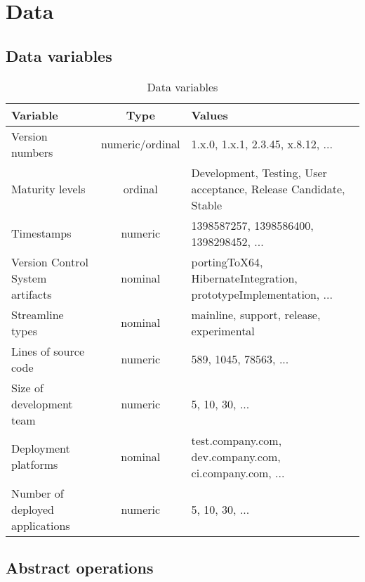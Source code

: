 \documentclass[journal]{vgtc}                %
\begin{document}
\section{Data}
\subsection{Data variables}

\begin{table}[H]
 \scriptsize
 \begin{center}
   \begin{tabular}{|l|c|p{3cm}|} 
   \hline
     \textbf{Variable} & \textbf{Type} & \textbf{Values} \\
   \hline
   \hline
     Version numbers  & numeric/ordinal & 1.x.0, 1.x.1, 2.3.45, x.8.12, ... \\ \hline  
     Maturity levels & ordinal & Development, Testing, User acceptance, Release Candidate, Stable \\ \hline  
     Timestamps & numeric & 1398587257, 1398586400, 1398298452, ... \\ \hline  
     Version Control System artifacts & nominal & portingToX64, HibernateIntegration, prototypeImplementation, ... \\ \hline  
     Streamline types & nominal & mainline, support, release, experimental \\ \hline  
     Lines of source code & numeric & 589, 1045, 78563, ... \\ \hline  
     Size of development team & numeric & 5, 10, 30, ... \\ \hline  
     Deployment platforms & nominal & test.company.com, dev.company.com, ci.company.com, ... \\ \hline  
     Number of deployed applications & numeric & 5, 10, 30, ... \\ \hline  
     
   \end{tabular}
   \caption{Data variables}
   \label{data_variables}
\end{center}
\end{table}


\subsection{Abstract operations}
\end{document}
